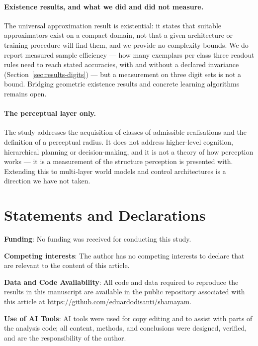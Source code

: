 \documentclass[10pt]{article}
\theoremstyle{plain}
\theoremstyle{definition}
\theoremstyle{remark}
\begin{document}
\paragraph{Existence results, and what we did and did not measure.}
The universal approximation result is existential: it states that suitable
approximators exist on a compact domain, not that a given architecture or
training procedure will find them, and we provide no complexity bounds. We do
report measured sample efficiency --- how many exemplars per class three
readout rules need to reach stated accuracies, with and without a declared
invariance (Section~\ref{sec:results-digits}) --- but a measurement on three
digit sets is not a bound. Bridging geometric
existence results and concrete learning algorithms remains open.

\paragraph{The perceptual layer only.}
The study addresses the acquisition of classes of admissible realisations and
the definition of a perceptual radius. It does not address higher-level
cognition, hierarchical planning or decision-making, and it is not a theory of
how perception works --- it is a measurement of the structure perception is
presented with. Extending this to multi-layer world models and control
architectures is a direction we have not taken.



\section*{Statements and Declarations}
\textbf{Funding}: No funding was received for conducting this study.

\textbf{Competing interests}: The author has no competing interests to declare that are relevant to the content of this article.

\textbf{Data and Code Availability}: All code and data required to reproduce the results in this manuscript are available in the public repository associated with this article at \url{https://github.com/eduardodisanti/shamayam}.

\textbf{Use of AI Tools}: AI tools were used for copy editing and to assist with parts of the analysis code; all content, methods, and conclusions were designed, verified, and are the responsibility of the author.



\end{document}
